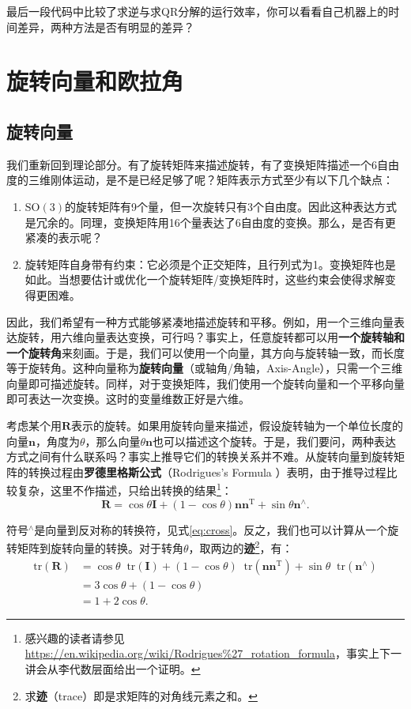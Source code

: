 最后一段代码中比较了求逆与求QR分解的运行效率，你可以看看自己机器上的时间差异，两种方法是否有明显的差异？

\section{旋转向量和欧拉角}
\subsection{旋转向量}
我们重新回到理论部分。有了旋转矩阵来描述旋转，有了变换矩阵描述一个6自由度的三维刚体运动，是不是已经足够了呢？矩阵表示方式至少有以下几个缺点：

\begin{enumerate}
	\item $\mathrm{SO}(3)$的旋转矩阵有9个量，但一次旋转只有3个自由度。因此这种表达方式是冗余的。同理，变换矩阵用16个量表达了6自由度的变换。那么，是否有更紧凑的表示呢？
	\item 旋转矩阵自身带有约束：它必须是个正交矩阵，且行列式为1。变换矩阵也是如此。当想要估计或优化一个旋转矩阵/变换矩阵时，这些约束会使得求解变得更困难。
\end{enumerate}

因此，我们希望有一种方式能够紧凑地描述旋转和平移。例如，用一个三维向量表达旋转，用六维向量表达变换，可行吗？事实上，任意旋转都可以用\textbf{一个旋转轴和一个旋转角}来刻画。于是，我们可以使用一个向量，其方向与旋转轴一致，而长度等于旋转角。这种向量称为\textbf{旋转向量}（或轴角/角轴，Axis-Angle），只需一个三维向量即可描述旋转。同样，对于变换矩阵，我们使用一个旋转向量和一个平移向量即可表达一次变换。这时的变量维数正好是六维。

考虑某个用$\bm{R}$表示的旋转。如果用旋转向量来描述，假设旋转轴为一个单位长度的向量$\bm{n}$，角度为$\theta$，那么向量$\theta \bm{n}$也可以描述这个旋转。于是，我们要问，两种表达方式之间有什么联系吗？事实上推导它们的转换关系并不难。从旋转向量到旋转矩阵的转换过程由\textbf{罗德里格斯公式}（Rodrigues's Formula ）表明，由于推导过程比较复杂，这里不作描述，只给出转换的结果\footnote{感兴趣的读者请参见\url{https://en.wikipedia.org/wiki/Rodrigues\%27_rotation_formula}，事实上下一讲会从李代数层面给出一个证明。}：
\begin{equation}
\label{eq:rogridues}
\bm{R} = \cos \theta \bm{I} + \left( {1 - \cos \theta } \right) \bm{n}{\bm{n}^\mathrm{T}} + \sin \theta { \bm{n}^ \wedge }.
\end{equation}

符号$^\wedge$是向量到反对称的转换符，见式\eqref{eq:cross}。反之，我们也可以计算从一个旋转矩阵到旋转向量的转换。对于转角$\theta$，取两边的\textbf{迹}\footnote{求\textbf{迹}（trace）即是求矩阵的对角线元素之和。}，有：
\begin{equation}
\begin{aligned}
  \mathrm{tr} \left( \bm{R} \right) &= \cos \theta \mathop{}\!\mathrm{tr}\left( \bm{I} \right) + \left( {1 - \cos \theta } \right) \mathop{}\!\mathrm{tr} \left( { \bm{n} {\bm{n}^\mathrm{T}}} \right) + \sin \theta \mathop{}\!\mathrm{tr} ({\bm{n}^ \wedge })\\
&= 3\cos \theta  + (1 - \cos \theta )\\
&= 1 + 2\cos \theta .
\end{aligned} 
\end{equation}

